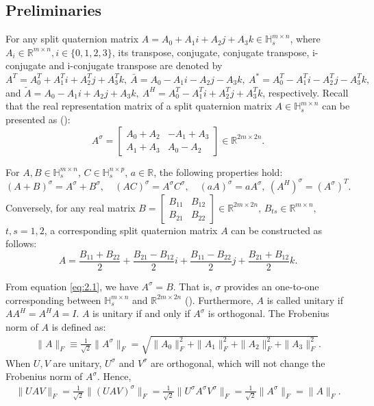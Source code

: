 \documentclass{book}
\makeatletter
\def\my@tag@font{\normalsize}
\let\amsmath@eqref\eqref
\renewcommand\eqref[1]{{\let\my@tag@font\relax\amsmath@eqref{#1}}}
\theoremstyle{remark}
\makeatother
\begin{document}
\begin{multicols}{2}
\section{Preliminaries}
For any split quaternion matrix ${A}=A_{0}+A_{1}i + A_{2}j + A_{3}k \in\mathbb{H}_{s}^{m\times n}$, where $A_{i}\in\mathbb{R}^{m\times n}, i\in\{0,1,2,3\}$, its transpose, conjugate, conjugate transpose, i-conjugate and i-conjugate transpose are  denoted by 
 ${A}^T = A_0^T + A_1^Ti + A_2^Tj + A_3^Tk, \ \bar{{A}} = A_0 - A_1i - A_2j - A_3k, \ {A}^* = A_0^T - A_1^Ti - A_2^Tj - A_3^Tk,$ and
 $\tilde{A} = A_0 - A_1i + A_2j + A_3k, \ {A}^H = A_0^T - A_1^Ti + A_2^Tj + A_3^Tk$, respectively. Recall that the real representation matrix of a split quaternion matrix $A \in\mathbb{H}_{s}^{m\times n}$ can be presented as (\cite{TJiang2018, Gang2024}):
\begin{equation}\label{eq:2.1}
A^\sigma = \begin{bmatrix} A_0 + A_2 & -A_1 + A_3 \\ A_1 + A_3 & A_0 - A_2 \end{bmatrix} \in \mathbb{R}^{2m \times 2n}.
\end{equation}

For $A, B \in \mathbb{H}_s^{m \times n}$, $C \in \mathbb{H}_s^{n \times p}$, $a \in \mathbb{R}$, the following properties hold:
\begin{equation}\label{eq:2.2}
    (A + B)^\sigma = A^\sigma + B^\sigma, \quad (AC)^\sigma = A^\sigma C^\sigma, \quad (a A)^\sigma = a A^\sigma, \ (A^H)^\sigma = (A^\sigma)^T.
\end{equation}
Conversely, for any real matrix $B = \begin{bmatrix} B_{11} & B_{12} \\ B_{21} & B_{22} \end{bmatrix} \in \mathbb{R}^{2m \times 2n}$, $B_{ts} \in \mathbb{R}^{m \times n}$, $t, s = 1, 2$, a corresponding split quaternion matrix $A$ can be constructed as follows:
\begin{equation}\label{eq:2.3}
{A} = \frac{B_{11} + B_{22}}{2} + \frac{B_{21} - B_{12}}{2}i + \frac{B_{11} - B_{22}}{2}j + \frac{B_{21} + B_{12}}{2}k.
\end{equation}

From equation \eqref{eq:2.1}, we have ${A}^\sigma = B$. 
That is, $\sigma$ provides an one-to-one corresponding between $\mathbb{H}_s^{m\times n}$ and $\mathbb{R}^{2m \times 2n}$ (\cite{Gang2024}). Furthermore, $A$ is called unitary if $AA^H = A^H A = I$. $A$ is unitary if and only if $A^\sigma$ is orthogonal.
 The Frobenius norm of $A$ is defined as: 
 \begin{align*}
     \| A \|_F \equiv \frac{1}{\sqrt{2}} \| A^\sigma \|_F = \sqrt{\| A_0 \|_F^2 + \| A_1 \|_F^2 + \| A_2 \|_F^2 + \| A_3 \|_F^2}.
\end{align*}
When $U, V$ are unitary, $U^\sigma$ and $V^\sigma$ are orthogonal, which will not change the Frobenius norm of $A^\sigma$. Hence,
\begin{align*}
\|UAV\|_F = \frac{1}{\sqrt{2}} \|(UAV)^\sigma\|_F 
= \frac{1}{\sqrt{2}} \|U^\sigma A^\sigma V^\sigma\|_F 
= \frac{1}{\sqrt{2}} \|A^\sigma\|_F 
= \|A\|_F.
\end{align*}


\end{multicols}
\end{document}
